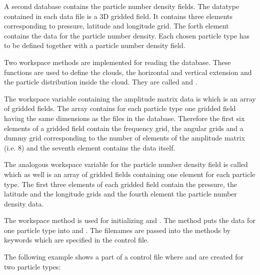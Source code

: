 \label{sec:scattering:pnd_data}

A second database contains the particle number density fields. 
The datatype contained in each data file is a
3D gridded field. It contains three elements corresponding to 
pressure, latitude and longitude grid. The forth element contains the
data for the particle number density. Each chosen particle type 
has to be defined together with a
particle number density field.

\label{sec:scattering:read_data}

Two workspace methods are implemented for reading the database. These
functions are used to define the clouds, the horizontal and vertical
extension and the particle distribution inside the cloud. They
are called  and . 

The workspace variable containing the amplitude matrix data is
 which is an array of gridded fields. The
array contains for each particle type one gridded field having the
same dimensions as the files in the database. Therefore the first six
elements of a gridded field contain the
frequency grid, the angular grids and a dummy grid corresponding
to the number of
elements of the amplitude matrix (i.e. 8) and the seventh element 
contains the data itself.

The analogous workspace variable for the particle number density
field is called  which as well is an array of
gridded fields containing one element for each particle type. The
first three elements of each gridded field contain the pressure, the
latitude and the longitude grids and the fourth element the particle
number density data. 

The workspace method  is used for initializing
 and . 
The method  puts the data for one particle
type into  and . The
filenames are passed into the methods by keywords which are specified
in the control file.

The following example shows a part of a control file where
 and   are created
for two particle types:


